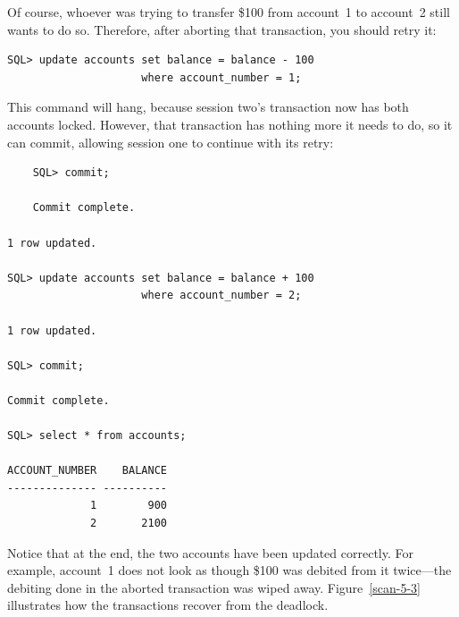 Of course, whoever was trying to transfer \$100 from account~1 to
account~2 still wants to do so.  Therefore, after aborting that
transaction, you should retry it:
\begin{verbatim}
SQL> update accounts set balance = balance - 100
                     where account_number = 1;
\end{verbatim}
This command will hang, because session two's transaction now has both
accounts locked.  However, that transaction has nothing more it needs
to do, so it can commit, allowing session one to continue with its retry:
\begin{verbatim}
    SQL> commit;

    Commit complete.

1 row updated.

SQL> update accounts set balance = balance + 100 
                     where account_number = 2;

1 row updated.

SQL> commit;

Commit complete.

SQL> select * from accounts;

ACCOUNT_NUMBER    BALANCE                                                       
-------------- ----------                                                       
             1        900                                                       
             2       2100                                                       
\end{verbatim}
Notice that at the end, the two accounts have been updated correctly.
For example, account~1 does not look as though \$100 was debited from
it twice---the debiting done in the aborted transaction was wiped
away.  Figure~\ref{scan-5-3} illustrates how the transactions recover
from the deadlock.
